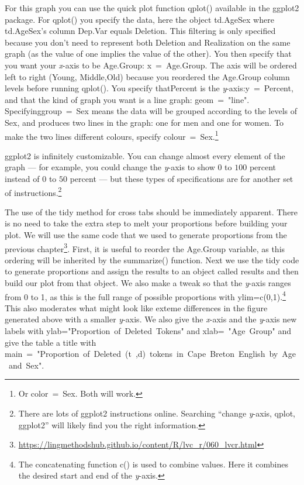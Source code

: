 \documentclass[
  10pt,
  letterpaper]{article}
\renewcommand\texttt[1]{{\ttfamily\color{BrickRed}#1}}
\DeclareRobustCommand{\href}[2]{#2\footnote{\url{#1}}}
\begin{document}
For this graph you can use the quick plot function \texttt{qplot()}
available in the \texttt{ggplot2} package. For \texttt{qplot()} you
specify the data, here the object \texttt{td.AgeSex} where
\texttt{td.AgeSex}'s column \texttt{Dep.Var} equals \texttt{Deletion}.
This filtering is only specified because you don't need to represent
both \texttt{Deletion} and \texttt{Realization} on the same graph (as
the value of one implies the value of the other). You then specify that
you want your \emph{x}-axis to be \texttt{Age.Group}:
\texttt{x\ =\ Age.Group}. The axis will be ordered left to right
(\texttt{Young}, \texttt{Middle},\texttt{Old}) because you reordered the
\texttt{Age.Group} column levels before running \texttt{qplot()}. You
specify that\texttt{Percent} is the
\emph{y}-axis:\texttt{y\ =\ Percent}, and that the kind of graph you
want is a line graph: \texttt{geom\ =\ "line"}.
Specifying\texttt{group\ =\ Sex} means the data will be grouped
according to the levels of \texttt{Sex}, and produces two lines in the
graph: one for men and one for women. To make the two lines different
colours, specify \texttt{colour\ =\ Sex}.\footnote{Or
  \texttt{color\ =\ Sex}. Both will work.}

\texttt{ggplot2} is infinitely customizable. You can change almost every
element of the graph --- for example, you could change the \emph{y}-axis
to show \(0\) to \(100\) percent instead of \(0\) to \(50\) percent ---
but these types of specifications are for another set of
instructions.\footnote{There are lots of \texttt{ggplot2} instructions
  online. Searching ``change \emph{y}-axis, qplot, ggplot2'' will likely
  find you the right information.}

The use of the \texttt{tidy} method for cross tabs should be immediately
apparent. There is no need to take the extra step to melt your
proportions before building your plot. We will use the same code that we
used to generate proportions from
\href{https://lingmethodshub.github.io/content/R/lvc_r/060_lvcr.html}{the
previous chapter}. First, it is useful to reorder the \texttt{Age.Group}
variable, as this ordering will be inherited by the \texttt{summarize()}
function. Next we use the \texttt{tidy} code to generate proportions and
assign the results to an object called \texttt{results} and then build
our plot from that object. We also make a tweak so that the
\emph{y}-axis ranges from 0 to 1, as this is the full range of possible
proportions with \texttt{ylim=c(0,1)}.\footnote{The concatenating
  function \texttt{c()} is used to combine values. Here it combines the
  desired start and end of the \emph{y}-axis.} This also moderates what
might look like exteme differences in the figure generated above with a
smaller \emph{y}-axis. We also give the \emph{x}-axis and the
\emph{y}-axis new labels with
\texttt{ylab="Proportion\ of\ Deleted\ Tokens"} and
\texttt{xlab=\ "Age\ Group"} and give the table a title with
\texttt{main\ =\ "Proportion\ of\ Deleted\ (t\ ,d)\ tokens\ in\ Cape\ Breton\ English\ by\ Age\ and\ Sex"}.
\end{document}
